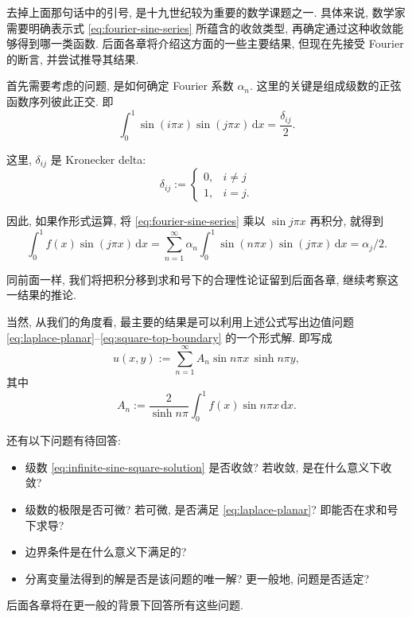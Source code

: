 去掉上面那句话中的引号, 是十九世纪较为重要的数学课题之一. 具体来说, 数学家需要明确表示式 \eqref{eq:fourier-sine-series} 所蕴含的收敛类型, 再确定通过这种收敛能够得到哪一类函数. 后面各章将介绍这方面的一些主要结果, 但现在先接受 Fourier 的断言, 并尝试推导其结果.

首先需要考虑的问题, 是如何确定 Fourier 系数 $\alpha_n$. 这里的关键是组成级数的正弦函数序列彼此正交. 即
\begin{equation}\label{eq:sine-orthogonality}
\int_0^1\sin(i\pi x)\sin(j\pi x)\,\mathrm{d}x=\dfrac{\delta_{ij}}{2}.
\end{equation}


这里, $\delta_{ij}$ 是 Kronecker delta:
\begin{equation}\label{eq:kronecker-delta}
\delta_{ij}:=\begin{cases}0,&i\ne j\\1,&i=j.\end{cases}
\end{equation}


因此, 如果作形式运算, 将 \eqref{eq:fourier-sine-series} 乘以 $\sin j\pi x$ 再积分, 就得到
\begin{equation}\label{eq:sine-coefficient-integral}
\int_0^1f(x)\sin(j\pi x)\,\mathrm{d}x=\sum_{n=1}^{\infty}\alpha_n\int_0^1\sin(n\pi x)\sin(j\pi x)\,\mathrm{d}x=\alpha_j/2.
\end{equation}


同前面一样, 我们将把积分移到求和号下的合理性论证留到后面各章, 继续考察这一结果的推论.

当然, 从我们的角度看, 最主要的结果是可以利用上述公式写出边值问题 \eqref{eq:laplace-planar}--\eqref{eq:square-top-boundary} 的一个形式解. 即写成
\begin{equation}\label{eq:infinite-sine-square-solution}
u(x,y):=\sum_{n=1}^{\infty}A_n\sin n\pi x\,\sinh n\pi y,
\end{equation}
其中
\begin{equation}\label{eq:infinite-sine-solution-coefficients}
A_n:=\dfrac{2}{\sinh n\pi}\int_0^1f(x)\sin n\pi x\,\mathrm{d}x.
\end{equation}


还有以下问题有待回答:
\begin{itemize}
\item 级数 \eqref{eq:infinite-sine-square-solution} 是否收敛? 若收敛, 是在什么意义下收敛?
\item 级数的极限是否可微? 若可微, 是否满足 \eqref{eq:laplace-planar}? 即能否在求和号下求导?
\item 边界条件是在什么意义下满足的?
\item 分离变量法得到的解是否是该问题的唯一解? 更一般地, 问题是否适定?
\end{itemize}
后面各章将在更一般的背景下回答所有这些问题.

